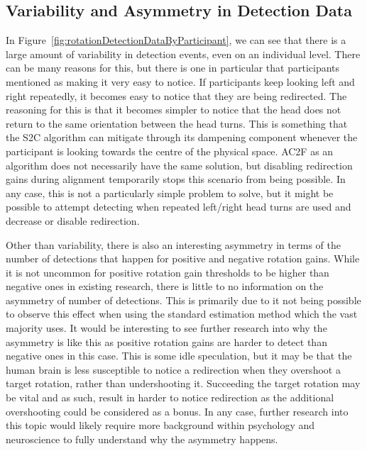 \subsection{Variability and Asymmetry in Detection Data}
In Figure~\ref{fig:rotationDetectionDataByParticipant}, we can see that there is a large amount of variability in detection events, even on an individual level. There can be many reasons for this, but there is one in particular that participants mentioned as making it very easy to notice. If participants keep looking left and right repeatedly, it becomes easy to notice that they are being redirected. The reasoning for this is that it becomes simpler to notice that the head does not return to the same orientation between the head turns. This is something that the S2C algorithm can mitigate through its dampening component whenever the participant is looking towards the centre of the physical space. AC2F as an algorithm does not necessarily have the same solution, but disabling redirection gains during alignment temporarily stops this scenario from being possible. In any case, this is not a particularly simple problem to solve, but it might be possible to attempt detecting when repeated left/right head turns are used and decrease or disable redirection. 

Other than variability, there is also an interesting asymmetry in terms of the number of detections that happen for positive and negative rotation gains. While it is not uncommon for positive rotation gain thresholds to be higher than negative ones in existing research, there is little to no information on the asymmetry of number of detections. This is primarily due to it not being possible to observe this effect when using the standard estimation method which the vast majority uses. It would be interesting to see further research into why the asymmetry is like this as positive rotation gains are harder to detect than negative ones in this case. This is some idle speculation, but it may be that the human brain is less susceptible to notice a redirection when they overshoot a target rotation, rather than undershooting it. Succeeding the target rotation may be vital and as such, result in harder to notice redirection as the additional overshooting could be considered as a bonus. In any case, further research into this topic would likely require more background within psychology and neuroscience to fully understand why the asymmetry happens. 

